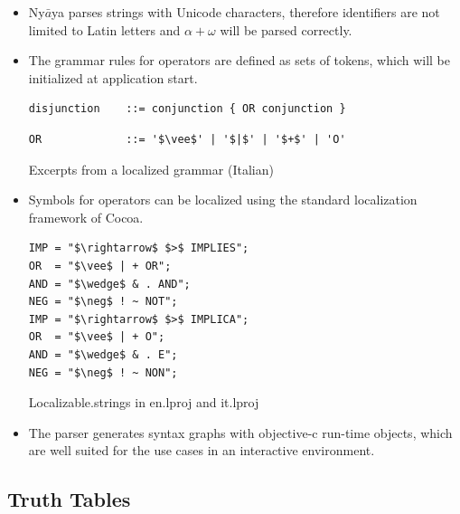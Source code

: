 \begin{itemize}

\item Ny$\bar{a}$ya parses strings with Unicode characters, 
therefore identifiers are not limited to Latin letters and
$\alpha + \omega$ will be parsed correctly. 

\item The grammar rules for operators are defined as sets of tokens, 
which will be initialized at application start. 

\begin{table}[htdp]
\begin{center}
\begin{lstlisting}[mathescape,firstnumber=7]
disjunction    ::= conjunction { OR conjunction }
\end{lstlisting}
\begin{lstlisting}[mathescape,firstnumber=15]
OR             ::= '$\vee$' | '$|$' | '$+$' | 'O'
\end{lstlisting}
\caption{Excerpts from a localized grammar (Italian)}
\label{tab:LocalizedEBNF}
\end{center}
\end{table}

\item Symbols for operators
can be localized using the standard localization framework of Cocoa.

\begin{table}[htdp]
\begin{center}
\begin{lstlisting}[mathescape,numbers=none,multicols=2]
IMP = "$\rightarrow$ $>$ IMPLIES";
OR  = "$\vee$ | + OR";
AND = "$\wedge$ & . AND";
NEG = "$\neg$ ! ~ NOT";
IMP = "$\rightarrow$ $>$ IMPLICA";
OR  = "$\vee$ | + O";
AND = "$\wedge$ & . E";
NEG = "$\neg$ ! ~ NON";
\end{lstlisting}
\caption{Localizable.strings in en.lproj and it.lproj}
\label{tab:LocalizableStrings}
\end{center}
\end{table}


\item The parser generates syntax graphs with objective-c run-time objects,
which are well suited for the use cases in an interactive environment.

\end{itemize}

\subsection{Truth Tables}

